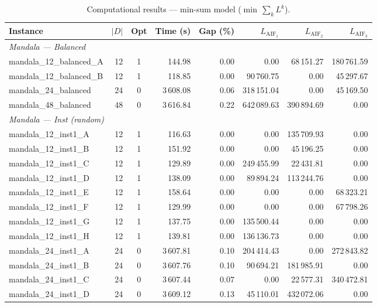 \documentclass{article}
\begin{document}
\begin{table}[h!]
\centering
\scriptsize
\caption{Computational results --- min-sum model ($\min\, \sum_k L^k$).}
\label{tab:results_sum}
\begin{tabular}{@{}l r c r r r r r@{}}
\toprule
\textbf{Instance} & $|D|$ & \textbf{Opt} & \textbf{Time (s)} & \textbf{Gap (\%)} & $L_{\text{AIF}_1}$ & $L_{\text{AIF}_2}$ & $L_{\text{AIF}_3}$ \\
\midrule
\multicolumn{8}{l}{\textit{Mandala --- Balanced}} \\
\midrule
mandala\_12\_balanced\_A & 12 & 1 & 144.98 & 0.00 & 0.00 & 68\,151.27 & 180\,761.59 \\
mandala\_12\_balanced\_B & 12 & 1 & 118.85 & 0.00 & 90\,760.75 & 0.00 & 45\,297.67 \\
mandala\_24\_balanced    & 24 & 0 & 3\,608.08 & 0.06 & 318\,151.04 & 0.00 & 45\,169.50 \\
mandala\_48\_balanced    & 48 & 0 & 3\,616.84 & 0.22 & 642\,089.63 & 390\,894.69 & 0.00 \\
\midrule
\multicolumn{8}{l}{\textit{Mandala --- Inst (random)}} \\
\midrule
mandala\_12\_inst1\_A & 12 & 1 & 116.63 & 0.00 & 0.00 & 135\,709.93 & 0.00 \\
mandala\_12\_inst1\_B & 12 & 1 & 151.92 & 0.00 & 0.00 & 45\,196.25 & 0.00 \\
mandala\_12\_inst1\_C & 12 & 1 & 129.89 & 0.00 & 249\,455.99 & 22\,431.81 & 0.00 \\
mandala\_12\_inst1\_D & 12 & 1 & 138.09 & 0.00 & 89\,894.24 & 113\,244.76 & 0.00 \\
mandala\_12\_inst1\_E & 12 & 1 & 158.64 & 0.00 & 0.00 & 0.00 & 68\,323.21 \\
mandala\_12\_inst1\_F & 12 & 1 & 129.99 & 0.00 & 0.00 & 0.00 & 67\,798.26 \\
mandala\_12\_inst1\_G & 12 & 1 & 137.75 & 0.00 & 135\,500.44 & 0.00 & 0.00 \\
mandala\_12\_inst1\_H & 12 & 1 & 139.81 & 0.00 & 136\,136.73 & 0.00 & 0.00 \\
mandala\_24\_inst1\_A & 24 & 0 & 3\,607.81 & 0.10 & 204\,414.43 & 0.00 & 272\,843.82 \\
mandala\_24\_inst1\_B & 24 & 0 & 3\,607.76 & 0.10 & 90\,694.21 & 181\,985.91 & 0.00 \\
mandala\_24\_inst1\_C & 24 & 0 & 3\,607.44 & 0.07 & 0.00 & 22\,577.31 & 340\,472.81 \\
mandala\_24\_inst1\_D & 24 & 0 & 3\,609.12 & 0.13 & 45\,110.01 & 432\,072.06 & 0.00 \\

\end{tabular}
\end{table}
\end{document}
